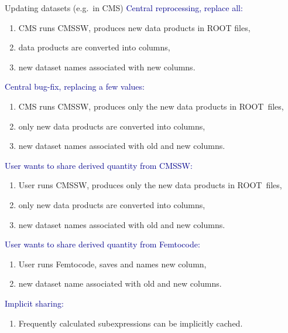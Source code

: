 \documentclass{beamer}
\begin{document}
\begin{frame}{Updating datasets (e.g.\ in CMS)}
\small
\vspace{0.5 cm}
\textcolor{darkblue}{Central reprocessing, replace all:}
\vspace{-0.15 cm}
\begin{enumerate}\setlength{\itemsep}{-0.1 cm}
\item \small CMS runs CMSSW, produces new data products in ROOT files,
\item \small data products are converted into columns,
\item \small new dataset names associated with new columns.
\end{enumerate}

\textcolor{darkblue}{Central bug-fix, replacing a few values:}
\vspace{-0.15 cm}
\begin{enumerate}\setlength{\itemsep}{-0.1 cm}
\item \small CMS runs CMSSW, produces only the new data products in \mbox{ROOT files,\hspace{-1 cm}}
\item \small only new data products are converted into columns,
\item \small new dataset names associated with old and new columns.
\end{enumerate}

\textcolor{darkblue}{User wants to share derived quantity from CMSSW:}
\vspace{-0.15 cm}
\begin{enumerate}\setlength{\itemsep}{-0.1 cm}
\item \small User runs CMSSW, produces only the new data products in \mbox{ROOT files,\hspace{-1 cm}}
\item \small only new data products are converted into columns,
\item \small new dataset names associated with old and new columns.
\end{enumerate}

\textcolor{darkblue}{User wants to share derived quantity from Femtocode:}
\vspace{-0.15 cm}
\begin{enumerate}\setlength{\itemsep}{-0.1 cm}
\item \small User runs Femtocode, saves and names new column,
\item \small new dataset name associated with old and new columns.
\end{enumerate}

\textcolor{darkblue}{Implicit sharing:}
\vspace{-0.15 cm}
\begin{enumerate}\setlength{\itemsep}{-0.1 cm}
\item \small Frequently calculated subexpressions can be implicitly cached.
\end{enumerate}
\end{frame}
\end{document}
